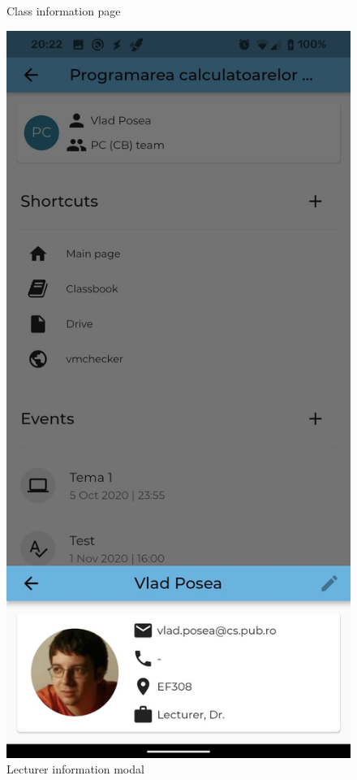 \begin{figure}[!ht]
\begin{minipage}[b]{0.26\textwidth}
        \caption{Class information page}
        \label{4:fig:class}
    \end{minipage}
    \hfill
    \begin{minipage}[b]{0.26\textwidth}
        \captionsetup{justification=centering}
        \includegraphics[width=\textwidth]{figures/app/flutter/lecturer.jpg}
        \caption{Lecturer information modal}
        \label{4:fig:lecturer}
    \end{minipage}
\end{figure}

